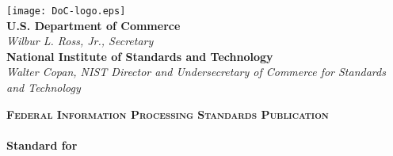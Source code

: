 \documentclass[12pt]{article}
\begin{document}
\begin{titlepage}
\texttt{[image: DoC-logo.eps]}\\ 
\vfill
\footnotesize \textbf{U.S. Department of Commerce}\\ 
\textit{Wilbur L. Ross, Jr., Secretary}\\
\vspace{10pt}
\textbf{National Institute of Standards and Technology}\\ 
\textit{Walter Copan, NIST Director and Undersecretary of Commerce for Standards and Technology}  
\end{titlepage}








\clearpage

\begin{center}
\normalsize{\textbf{\textsc{Federal Information Processing Standards Publication }}}\\
\vspace{10pt}
\normalsize{\textbf{}}\\
\vspace{10pt}
\normalsize{\textbf{Standard for}}\\
\Large{\textbf{}}

\vspace{10pt}

\normalsize

\hypersetup{linkcolor=black}

    \tableofcontents
    \listoftables
    \listoffigures

\end{center}
\clearpage
\end{document}
